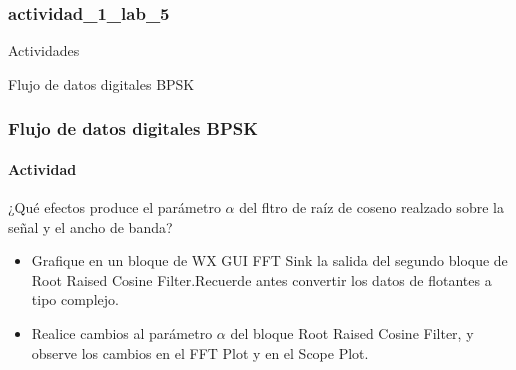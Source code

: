\subsubsection{actividad_1_lab_5}

\begin{frame}

\begin{block}{}
\centering
\vspace{8mm}
\Large{Actividades}
\vspace{8mm}
\end{block}
\end{frame}

\begin{frame}{Flujo de datos digitales BPSK}

\frametitle{Flujo de datos digitales BPSK}
\framesubtitle{Actividad}
¿Qué efectos produce el parámetro $\alpha$ del fltro de raíz de coseno realzado sobre la señal y el ancho de banda?\\
\begin{itemize}
\item Grafique en un bloque de WX GUI FFT Sink la salida del segundo bloque de Root Raised Cosine Filter.Recuerde antes convertir los datos de flotantes a tipo complejo.     
\item Realice cambios al parámetro $\alpha$ del bloque Root Raised Cosine Filter, y observe los cambios en el FFT Plot y en el Scope Plot.
\end{itemize}

\end{frame}
